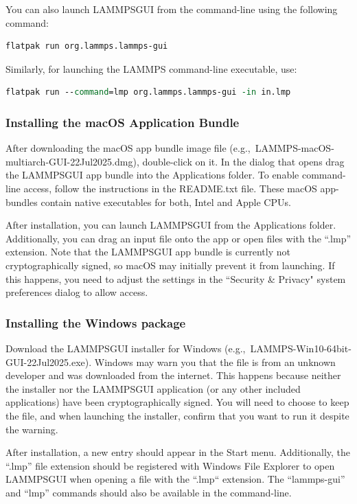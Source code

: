 \documentclass[9pt,tutorial]{livecoms}
\newcommand{\lammpsgui}{\textsf{LAMMPS\textendash GUI}}
\begin{document}
\begin{appendices}
You can also launch \lammpsgui{} from the command-line using the following command:
\begin{lstlisting}[language=tcl]
flatpak run org.lammps.lammps-gui
\end{lstlisting}
Similarly, for launching the LAMMPS command-line executable, use:
\begin{lstlisting}[language=tcl]
flatpak run --command=lmp org.lammps.lammps-gui -in in.lmp
\end{lstlisting}

\subsubsection{Installing the macOS Application Bundle}

After downloading the macOS app bundle image file
{\color{blue}(e.g.,~LAMMPS-macOS-multiarch-GUI-22Jul2025.dmg)}, double-click
on it.  In the dialog that opens drag the \lammpsgui{} app bundle into
the Applications folder.  To enable command-line access, follow the
instructions in the README.txt file.  These macOS app-bundles contain
native executables for both, Intel and Apple CPUs.

After installation, you can launch \lammpsgui{} from the Applications
folder.  Additionally, you can drag an input file onto the app or open
files with the ``.lmp'' extension.  Note that the \lammpsgui{} app bundle is
currently not cryptographically signed, so macOS may initially prevent
it from launching.  If this happens, you need to adjust the settings in
the ``Security \& Privacy" system preferences dialog to allow access.

\subsubsection{Installing the Windows package}

Download the \lammpsgui{} installer for Windows
{\color{blue}(e.g.,~LAMMPS-Win10-64bit-GUI-22Jul2025.exe)}.  Windows may warn
you that the file is from an unknown developer and was downloaded from
the internet.  This happens because neither the installer nor the
\lammpsgui{} application (or any other included applications) have been
cryptographically signed.  You will need to choose to keep the file, and
when launching the installer, confirm that you want to run it despite
the warning.

After installation, a new entry should appear in the Start menu.
Additionally, the ``.lmp'' file extension should be registered with
Windows File Explorer to open \lammpsgui{} when opening a file with the
``.lmp`` extension.  The ``lammps-gui'' and ``lmp'' commands should also
be available in the command-line.


\end{appendices}
\end{document}
